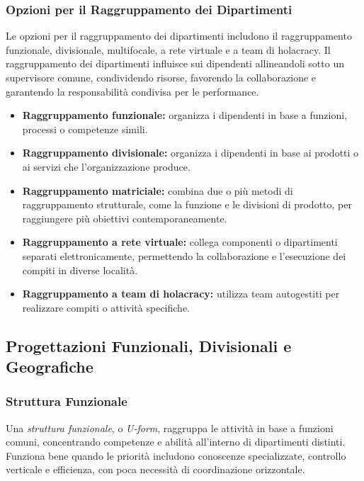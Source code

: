 \documentclass{article}
\begin{document}
\subsubsection{Opzioni per il Raggruppamento dei Dipartimenti}

Le opzioni per il raggruppamento dei dipartimenti includono il raggruppamento funzionale, divisionale, multifocale, a rete virtuale e a team di holacracy. Il raggruppamento dei dipartimenti influisce sui dipendenti allineandoli sotto un supervisore comune, condividendo risorse, favorendo la collaborazione e garantendo la responsabilità condivisa per le performance.

\begin{itemize}
    \item \textbf{Raggruppamento funzionale:} organizza i dipendenti in base a funzioni, processi o competenze simili.
    \item \textbf{Raggruppamento divisionale:} organizza i dipendenti in base ai prodotti o ai servizi che l'organizzazione produce.
    \item \textbf{Raggruppamento matriciale:} combina due o più metodi di raggruppamento strutturale, come la funzione e le divisioni di prodotto, per raggiungere più obiettivi contemporaneamente.
    \item \textbf{Raggruppamento a rete virtuale:} collega componenti o dipartimenti separati elettronicamente, permettendo la collaborazione e l'esecuzione dei compiti in diverse località.
    \item \textbf{Raggruppamento a team di holacracy:} utilizza team autogestiti per realizzare compiti o attività specifiche.
\end{itemize}

\subsection{Progettazioni Funzionali, Divisionali e Geografiche}

\subsubsection{Struttura Funzionale}

Una \textit{struttura funzionale}, o \textit{U-form}, raggruppa le attività in base a funzioni comuni, concentrando competenze e abilità all'interno di dipartimenti distinti. Funziona bene quando le priorità includono conoscenze specializzate, controllo verticale e efficienza, con poca necessità di coordinazione orizzontale.
\end{document}
